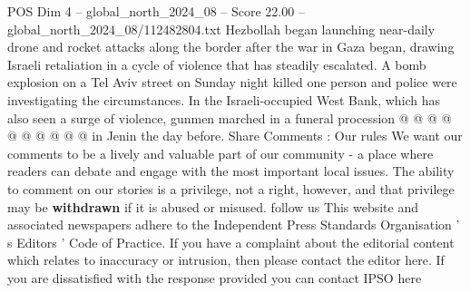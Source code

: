 \begin{textsample}{POS Dim 4 – global\_north\_2024\_08 – Score 22.00 – global\_north\_2024\_08/112482804.txt}
Hezbollah began launching near-daily drone and rocket attacks along the border after the war in Gaza began, drawing Israeli retaliation in a cycle of violence that has steadily escalated.
A bomb explosion on a Tel Aviv street on Sunday night killed one person and police were investigating the circumstances.
In the Israeli-occupied West Bank, which has also seen a surge of violence, gunmen marched in a funeral procession @ @ @ @ @ @ @ @ @ @ in Jenin the day before.
Share Comments : Our rules We want our comments to be a lively and valuable part of our community - a place where readers can debate and engage with the most important local issues.
The ability to comment on our stories is a privilege, not a right, however, and that privilege may be \textbf{withdrawn} if it is abused or misused. follow us This website and associated newspapers adhere to the Independent Press Standards Organisation ' s Editors ' Code of Practice.
If you have a complaint about the editorial content which relates to inaccuracy or intrusion, then please contact the editor here.
If you are dissatisfied with the response provided you can contact IPSO here

\end{textsample}
